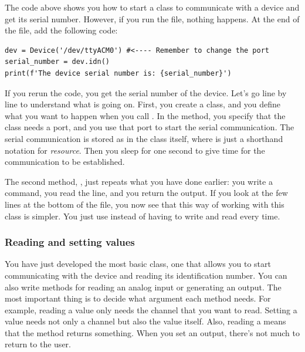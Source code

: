 The code above shows you how to start a class to communicate with a device and get its serial number. However, if you run the file, nothing happens. At the end of the file, add the following code:

\begin{verbatim}
dev = Device('/dev/ttyACM0') #<---- Remember to change the port
serial_number = dev.idn()
print(f'The device serial number is: {serial_number}')
\end{verbatim}

If you rerun the code, you get the serial number of the device. Let's go line by line to understand what is going on. First, you create a class, and you define what you want to happen when you call . In the  method, you specify that the class needs a port, and you use that port to start the serial communication. The serial communication is stored as  in the class itself, where  is just a shorthand notation for \textit{resource}. Then you sleep for one second to give time for the communication to be established.

The second method, , just repeats what you have done earlier: you write a command, you read the line, and you return the output. If you look at the few lines at the bottom of the file, you now see that this way of working with this class is simpler. You just use  instead of having to write and read every time.



\subsubsection{Reading and setting values}
You have just developed the most basic class, one that allows you to start communicating with the device and reading its identification number. You can also write methods for reading an analog input or generating an output. The most important thing is to decide what argument each method needs. For example, reading a value only needs the channel that you want to read. Setting a value needs not only a channel but also the value itself. Also, reading a means that the method returns something. When you set an output, there's not much to return to the user.


